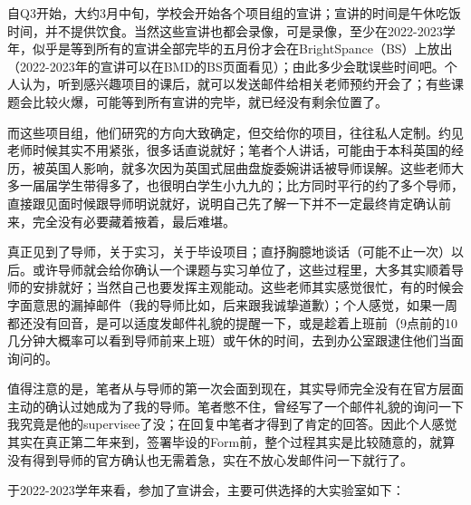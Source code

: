自Q3开始，大约3月中旬，学校会开始各个项目组的宣讲；宣讲的时间是午休吃饭时间，并不提供饮食。当然这些宣讲也都会录像，可是录像，至少在2022-2023学年，似乎是等到所有的宣讲全部完毕的五月份才会在BrightSpance（BS）上放出 （2022-2023年的宣讲可以在BMD的BS页面看见）；由此多少会耽误些时间吧。个人认为，听到感兴趣项目的课后，就可以发送邮件给相关老师预约开会了；有些课题会比较火爆，可能等到所有宣讲的完毕，就已经没有剩余位置了。

而这些项目组，他们研究的方向大致确定，但交给你的项目，往往私人定制。约见老师时候其实不用紧张，很多话直说就好；笔者个人讲话，可能由于本科英国的经历，被英国人影响，就多次因为英国式屈曲盘旋委婉讲话被导师误解。这些老师大多一届届学生带得多了，也很明白学生小九九的；比方同时平行的约了多个导师，直接跟见面时候跟导师明说就好，说明自己先了解一下并不一定最终肯定确认前来，完全没有必要藏着掖着，最后难堪。

真正见到了导师，关于实习，关于毕设项目；直抒胸臆地谈话（可能不止一次）以后。或许导师就会给你确认一个课题与实习单位了，这些过程里，大多其实顺着导师的安排就好；当然自己也要发挥主观能动。这些老师其实感觉很忙，有的时候会字面意思的漏掉邮件（我的导师比如，后来跟我诚挚道歉）；个人感觉，如果一周都还没有回音，是可以适度发邮件礼貌的提醒一下，或是趁着上班前（9点前的10几分钟大概率可以看到导师前来上班）或午休的时间，去到办公室跟逮住他们当面询问的。

值得注意的是，笔者从与导师的第一次会面到现在，其实导师完全没有在官方层面主动的确认过她成为了我的导师。笔者憋不住，曾经写了一个邮件礼貌的询问一下我究竟是他的supervisee了没；在回复中笔者才得到了肯定的回答。因此个人感觉其实在真正第二年来到，签署毕设的Form前，整个过程其实是比较随意的，就算没有得到导师的官方确认也无需着急，实在不放心发邮件问一下就行了。

于2022-2023学年来看，参加了宣讲会，主要可供选择的大实验室如下：

